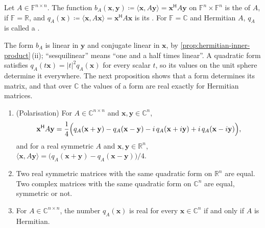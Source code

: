 \begin{definition}
\label{def:quadratic-form}
Let $A\in\mathbb F^{n\times n}$. The function $b_A(\mathbf x,\mathbf y)\coloneqq\langle\mathbf x,A\mathbf y\rangle=\mathbf x^{\mathsf H}A\mathbf y$ on $\mathbb F^n\times\mathbb F^n$ is the  of $A$,  if $\mathbb F=\mathbb R$, and $q_A(\mathbf x)\coloneqq\langle\mathbf x,A\mathbf x\rangle=\mathbf x^{\mathsf H}A\mathbf x$ is its . For $\mathbb F=\mathbb C$ and Hermitian $A$, $q_A$ is called a .
\end{definition}

The form $b_A$ is linear in $\mathbf y$ and conjugate linear in $\mathbf x$, by \cref{prop:hermitian-inner-product}\,(ii); ``sesquilinear'' means ``one and a half times linear''. A quadratic form satisfies $q_A(t\mathbf x)=|t|^2q_A(\mathbf x)$ for every scalar $t$, so its values on the unit sphere determine it everywhere. The next proposition shows that a form determines its matrix, and that over $\mathbb C$ the values of a form are real exactly for Hermitian matrices.

\begin{proposition}
\label{prop:form-matrix}
\leavevmode
\begin{enumerate}
\item (Polarisation) For $A\in\mathbb C^{n\times n}$ and $\mathbf x,\mathbf y\in\mathbb C^n$,
\[
\mathbf x^{\mathsf H}A\mathbf y=\frac14\Bigl(q_A(\mathbf x+\mathbf y)-q_A(\mathbf x-\mathbf y)-i\,q_A(\mathbf x+i\mathbf y)+i\,q_A(\mathbf x-i\mathbf y)\Bigr),
\]
and for a real symmetric $A$ and $\mathbf x,\mathbf y\in\mathbb R^n$, $\langle\mathbf x,A\mathbf y\rangle=\bigl(q_A(\mathbf x+\mathbf y)-q_A(\mathbf x-\mathbf y)\bigr)/4$.
\item Two real symmetric matrices with the same quadratic form on $\mathbb R^n$ are equal. Two complex matrices with the same quadratic form on $\mathbb C^n$ are equal, symmetric or not.
\item For $A\in\mathbb C^{n\times n}$, the number $q_A(\mathbf x)$ is real for every $\mathbf x\in\mathbb C^n$ if and only if $A$ is Hermitian.
\end{enumerate}
\end{proposition}

